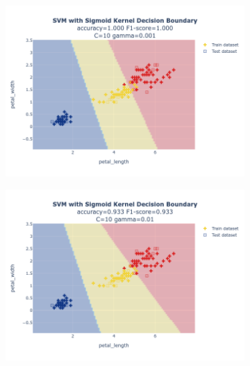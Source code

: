 \documentclass{article}
\begin{document}
\begin{figure}
\begin{subfigure}{0.3\textwidth}
        \includegraphics[scale=.13]{images/implementation/q1/sigmoid_kernel/petal_length_petal_width_10_0.001.png}
    \end{subfigure}
    \hfill
    \begin{subfigure}{0.3\textwidth}
        \centering
        \includegraphics[scale=.13]{images/implementation/q1/sigmoid_kernel/petal_length_petal_width_10_0.01.png}
    \end{subfigure}
    \hfill
    \begin{subfigure}{0.3\textwidth}
        \centering

\end{subfigure}
\end{figure}
\end{document}
